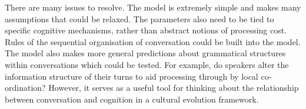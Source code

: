 \documentclass[12pt]{article}
\begin{document}
There are many issues to resolve.  The model is extremely simple and makes many assumptions that could be relaxed.  The parameters also need to be tied to specific cognitive mechanisms, rather than abstract notions of processing cost.  Rules of the sequential organisation of conversation could be built into the model.  The model also makes more general predictions about grammatical structures within conversations which could be tested.  For example, do speakers alter the information structure of their turns to aid processing through by local co-ordination?  However, it serves as a useful tool for thinking about the relationship between conversation and cognition in a cultural evolution framework.  





\end{document}
